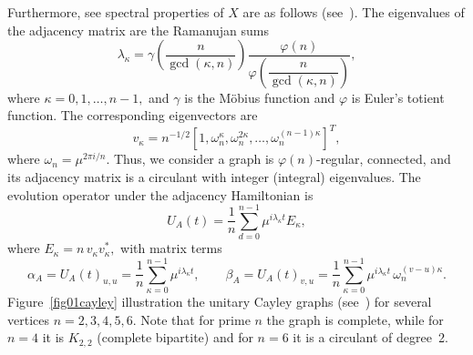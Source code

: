 \documentclass[12pt]{amsart}
\begin{document}
Furthermore, see spectral properties of $X$ are as follows (see~\cite{chan2021pretty, chan2020, klotz2007,liu2022}).
The eigenvalues of the adjacency matrix are the Ramanujan sums
\begin{equation}\label{eq:eigenvalues}
  \lambda_\kappa=\gamma\!\left(\frac{n}{\gcd(\kappa,n)}\right)\dfrac{\varphi(n)}{\varphi\!\left(\dfrac{n}{\gcd(\kappa,n)}\right)},
\end{equation}
where $\kappa= 0, 1, \ldots, n-1,$ and  $\gamma$ is the M\"{o}bius function and $\varphi$ is Euler's totient function.
The corresponding eigenvectors are $$v_\kappa=n^{-1/2}[1, \omega_n^{\kappa}, \omega_n^{2\kappa}, \ldots, \omega_n^{(n-1)\kappa}]^T,$$
where $\omega_n =\mu^{2\pi i/n}$.
Thus, we consider a graph is $\varphi(n)$-regular, connected, and its adjacency matrix is a circulant
with integer (integral) eigenvalues.
The evolution operator under the adjacency Hamiltonian is
\begin{equation}\label{eqq01evolutionadj}
  U_A(t) = \frac{1}{n}\sum_{d=0}^{n-1} \mu^{i\lambda_\kappa t} E_\kappa,
\end{equation}
where $E_\kappa= n\, v_\kappa v_\kappa^*,$
with matrix terms
\begin{equation}\label{eqq02evolutionadj}
  \alpha_A = U_A(t)_{u,u} = \frac{1}{n}\sum_{\kappa=0}^{n-1} \mu^{i\lambda_\kappa t}, \qquad
  \beta_A  = U_A(t)_{v,u} = \frac{1}{n}\sum_{\kappa=0}^{n-1} \mu^{i\lambda_\kappa t}\,\omega_n^{(v-u)\kappa}.
\end{equation}
Figure~\ref{fig01cayley} illustration the unitary Cayley graphs (see~\cite{klotz2007, liu2022, wang2024semi, soni2025mixed}) for several vertices $n = 2, 3, 4, 5, 6$. Note that for prime $n$ the graph is complete, while for $n=4$ it is $K_{2,2}$
           (complete bipartite) and for $n=6$ it is a circulant of degree~2.
\end{document}
